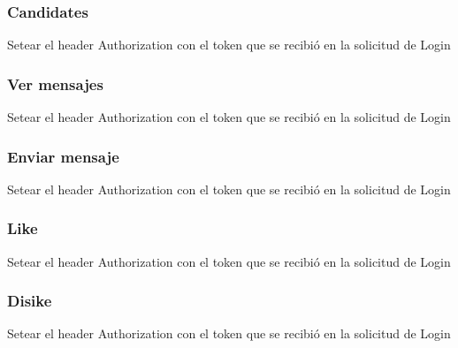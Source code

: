 \documentclass[letterpaper,10pt,english]{sphinxmanual}
\begin{document}


\subsubsection{Candidates}
\label{manuals:candidates}

Setear el header Authorization con el token que se recibió en la solicitud de Login



\subsubsection{Ver mensajes}
\label{manuals:ver-mensajes}

Setear el header Authorization con el token que se recibió en la solicitud de Login



\subsubsection{Enviar mensaje}
\label{manuals:enviar-mensaje}


Setear el header Authorization con el token que se recibió en la solicitud de Login



\subsubsection{Like}
\label{manuals:like}

Setear el header Authorization con el token que se recibió en la solicitud de Login



\subsubsection{Disike}
\label{manuals:disike}

Setear el header Authorization con el token que se recibió en la solicitud de Login
\end{document}

